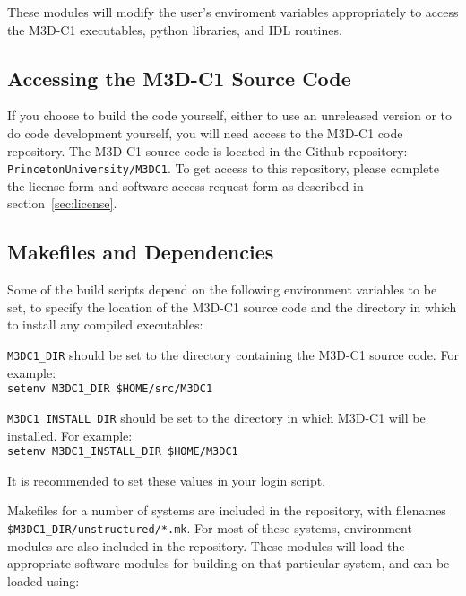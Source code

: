 These modules will modify the user's enviroment variables
appropriately to access the M3D-C1 executables, python libraries, and
IDL routines.



\subsection{Accessing the M3D-C1 Source Code}

If you choose to build the code yourself, either to use an unreleased
version or to do code development yourself, you will need access to
the M3D-C1 code repository.  The M3D-C1 source code is located in the
Github repository: \texttt{PrincetonUniversity/M3DC1}. To get access
to this repository, please complete the license form and software
access request form as described in section~\ref{sec:license}.


\subsection{Makefiles and Dependencies}

Some of the build scripts depend on the following environment
variables to be set, to specify the location of the M3D-C1 source code
and the directory in which to install any compiled executables:
\begin{description}
\item{\texttt{M3DC1\_DIR}} should be set to the directory containing
  the M3D-C1 source code.  For example:\\
  \texttt{setenv M3DC1\_DIR \$HOME/src/M3DC1}
\item{\texttt{M3DC1\_INSTALL\_DIR}} should be set to the directory in
  which M3D-C1 will be installed.  For example:\\
  \texttt{setenv M3DC1\_INSTALL\_DIR \$HOME/M3DC1}
\end{description}
It is recommended to set these values in your login script.

Makefiles for a number of systems are included in the repository,
with filenames \texttt{\$M3DC1\_DIR/unstructured/*.mk}.  For most of
these systems, environment modules are also included in the
repository.  These modules will load the appropriate software modules
for building on that particular system, and can be loaded using:


